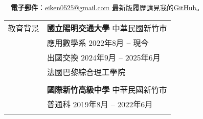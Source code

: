 \documentclass[letterpaper, 11pt]{article}
\begin{document}
\begin{CJK*}{UTF8}{bsmi}


\vspace{0.5cm} 
\noindent\:\ \ \:\!\:\!\textbf{電子郵件}：\href{mailto:eiken0525@gmail.com}{eiken0525@gmail.com} \hfill{\footnotesize 最新版履歷請見\href{https://github.com/eiken59/CV/blob/main/eiken59_CV_chinese.pdf}{我的GitHub}。\ \ \ \,}


\setlength{\tabcolsep}{8pt}
\vspace{-1.5em}
\begin{center}
    \begin{longtable}{p{0.72in}p{5.97in}}

        
        
        
        \textcolor{OliveGreen}{教育背景} 
        & \textbf{國立陽明交通大學} \hfill 中華民國新竹市 \\ 
        & 應用數學系 \hfill 2022年8月 -- 現今 \\
        & 出國交換 \hfill 2024年9月 -- 2025年6月\\
        & \qquad 法國巴黎綜合理工學院 \\
        & \\
        
        & \textbf{國際新竹高級中學} \hfill 中華民國新竹市 \\
        & 普通科 \hfill 2019年8月 -- 2022年6月\\
        & \\
        
        

\end{longtable}
\end{center}
\end{CJK*}
\end{document}
